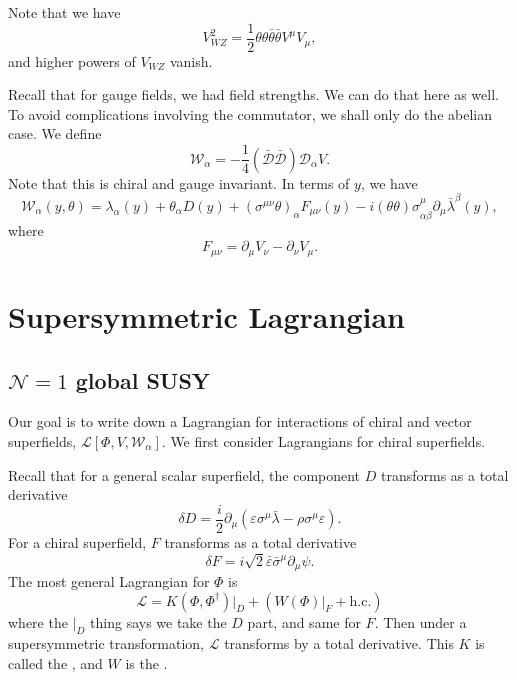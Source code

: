 \documentclass[a4paper]{article}
\begin{document}
Note that we have
\[
  V_{WZ}^2 = \frac{1}{2} \theta \theta \bar{\theta} \bar{\theta} V^\mu V_\mu,
\]
and higher powers of $V_{WZ}$ vanish.

Recall that for gauge fields, we had field strengths. We can do that here as well. To avoid complications involving the commutator, we shall only do the abelian case. We define
\[
  \mathcal{W}_\alpha = - \frac{1}{4} (\bar{\mathcal{D}} \bar{\mathcal{D}}) \mathcal{D}_\alpha V.
\]
Note that this is chiral and gauge invariant. In terms of $y$, we have
\[
  \mathcal{W}_\alpha(y, \theta) = \lambda_\alpha(y) + \theta_\alpha D(y) + (\sigma^{\mu\nu} \theta)_\alpha F_{\mu\nu}(y) - i (\theta \theta) \sigma^\mu_{\alpha \dot{\beta}} \partial_\mu \bar{\lambda}^\beta(y),
\]
where
\[
  F_{\mu\nu} = \partial_\mu V_\nu - \partial_\nu V_\mu.
\]
\section{Supersymmetric Lagrangian}
\subsection{\texorpdfstring{$\mathcal{N} = 1$}{N = 1} global SUSY}
Our goal is to write down a Lagrangian for interactions of chiral and vector superfields, $\mathcal{L}[\Phi, V, \mathcal{W}_\alpha]$. We first consider Lagrangians for chiral superfields.

Recall that for a general scalar superfield, the component $D$ transforms as a total derivative
\[
  \delta D = \frac{i}{2} \partial_\mu (\varepsilon \sigma^\mu \bar{\lambda} - \rho \sigma^\mu \varepsilon).
\]
For a chiral superfield, $F$ transforms as a total derivative
\[
  \delta F = i \sqrt{2} \bar{\varepsilon} \bar{\sigma}^\mu \partial_\mu \psi.
\]
The most general Lagrangian for $\Phi$ is
\[
  \mathcal{L} = K(\Phi, \Phi^\dagger)|_D + (W(\Phi)|_F + \text{h.c.})
\]
where the $|_D$ thing says we take the $D$ part, and same for $F$. Then under a supersymmetric transformation, $\mathcal{L}$ transforms by a total derivative. This $K$ is called the , and $W$ is the .
\end{document}
